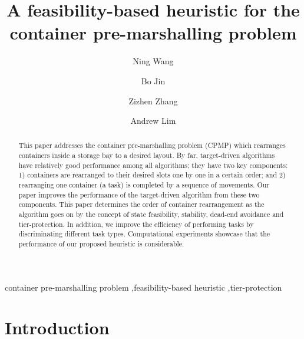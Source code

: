 \documentclass[review,3p,times,12pt,number]{elsarticle}\usepackage{amsmath}\usepackage{amssymb}
\begin{document}
\begin{frontmatter}

\title{A feasibility-based heuristic for the container pre-marshalling problem}
\author[shu]{Ning Wang}



\author[cityu]{Bo Jin}

\author[syu]{Zizhen Zhang}

\author[nus]{Andrew Lim}

\address[shu]{Department of Information Management, School of Management, Shanghai University, Shanghai, China}
\address[cityu]{Department of Management Sciences, City University of Hong Kong, Hong Kong}
\address[syu]{School of Data and Computer Science, Sun Yat-Sen University, China}
\address[nus]{Department of Industrial \& Systems Engineering, National University of Singapore, Singapore}

\begin{abstract}

This paper addresses the container pre-marshalling problem (CPMP) which rearranges containers inside a storage bay to a desired layout.
By far, target-driven algorithms have relatively good performance among all algorithms; they have two key components: 1) containers are rearranged to their desired slots one by one in a certain order; and 2) rearranging one container (a task) is completed by a sequence of movements. Our paper improves the performance of the target-driven algorithm from these two components.
This paper determines the order of container rearrangement as the algorithm goes on by the concept of state feasibility, stability, dead-end avoidance and tier-protection.
In addition, we improve the efficiency of performing tasks by discriminating different task types.
Computational experiments showcase that the performance of our proposed heuristic is considerable.
\end{abstract}

\begin{keyword}
container pre-marshalling problem \sep feasibility-based heuristic \sep tier-protection
\end{keyword}
\end{frontmatter}




\section{Introduction}
\end{document}
